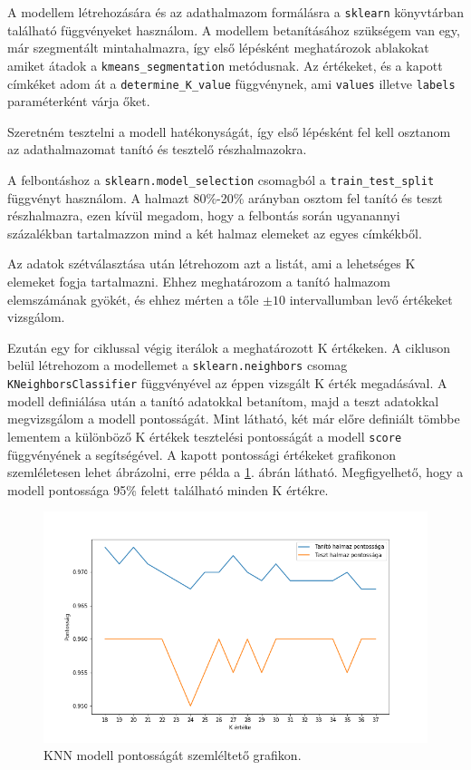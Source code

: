 A modellem létrehozására és az adathalmazom formálásra a \texttt{sklearn} könyvtárban található függvényeket használom. A modellem betanításához szükségem van egy, már szegmentált mintahalmazra, így első lépésként meghatározok ablakokat amiket átadok a \texttt{kmeans\_segmentation} metódusnak. Az értékeket, és a kapott címkéket adom át a \texttt{determine\_K\_value} függvénynek, ami \texttt{values} illetve \texttt{labels} paraméterként várja őket.

Szeretném tesztelni a modell hatékonyságát, így első lépésként fel kell osztanom az adathalmazomat tanító és tesztelő részhalmazokra. 

A felbontáshoz a \texttt{sklearn.model\_selection} csomagból a \texttt{train\_test\_split} függvényt használom. A halmazt 80\%-20\% arányban osztom fel tanító és teszt részhalmazra, ezen kívül megadom, hogy a felbontás során ugyanannyi százalékban tartalmazzon mind a két halmaz elemeket az egyes címkékből.

Az adatok szétválasztása után létrehozom azt a listát, ami a lehetséges K elemeket fogja tartalmazni. Ehhez meghatározom a tanító halmazom elemszámának gyökét, és ehhez mérten a tőle $\pm 10$ intervallumban levő értékeket vizsgálom.

Ezután egy for ciklussal végig iterálok a meghatározott K értékeken. A cikluson belül létrehozom a modellemet a \texttt{sklearn.neighbors} csomag \texttt{KNeighborsClassifier} függvényével az éppen vizsgált K érték megadásával. A modell definiálása után a tanító adatokkal betanítom, majd a teszt adatokkal megvizsgálom a modell pontosságát. Mint látható, két már előre definiált tömbbe lementem a különböző K értékek tesztelési pontosságát a modell \texttt{score} függvényének a segítségével. A kapott pontossági értékeket grafikonon szemléletesen lehet ábrázolni, erre példa a \ref{fig:knn_accuracy}. ábrán látható. Megfigyelhető, hogy a modell pontossága 95\% felett található minden K értékre.

\begin{figure}[h]
\centering
\includegraphics[scale=0.6]{images/knn_accuracy.png}
\caption{KNN modell pontosságát szemléltető grafikon.}
\label{fig:knn_accuracy}
\end{figure}

